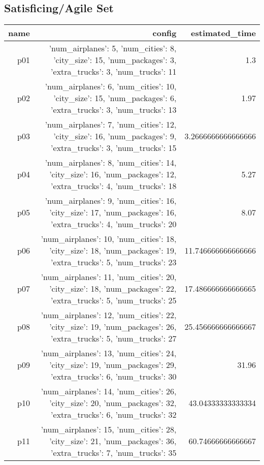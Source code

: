 \documentclass{article}
\begin{document}
                                \subsection*{Satisficing/Agile Set}
                                
                            \begin{center}
                            \scriptsize
                            \begin{tabular}{r|r|r}
                            name & config & estimated\_time\\\midrule
                              p01&{'num\_airplanes': 5, 'num\_cities': 8, 'city\_size': 15, 'num\_packages': 3, 'extra\_trucks': 3, 'num\_trucks': 11}&1.3\\
  p02&{'num\_airplanes': 6, 'num\_cities': 10, 'city\_size': 15, 'num\_packages': 6, 'extra\_trucks': 3, 'num\_trucks': 13}&1.97\\
  p03&{'num\_airplanes': 7, 'num\_cities': 12, 'city\_size': 16, 'num\_packages': 9, 'extra\_trucks': 3, 'num\_trucks': 15}&3.2666666666666666\\
  p04&{'num\_airplanes': 8, 'num\_cities': 14, 'city\_size': 16, 'num\_packages': 12, 'extra\_trucks': 4, 'num\_trucks': 18}&5.27\\
  p05&{'num\_airplanes': 9, 'num\_cities': 16, 'city\_size': 17, 'num\_packages': 16, 'extra\_trucks': 4, 'num\_trucks': 20}&8.07\\
  p06&{'num\_airplanes': 10, 'num\_cities': 18, 'city\_size': 18, 'num\_packages': 19, 'extra\_trucks': 5, 'num\_trucks': 23}&11.746666666666666\\
  p07&{'num\_airplanes': 11, 'num\_cities': 20, 'city\_size': 18, 'num\_packages': 22, 'extra\_trucks': 5, 'num\_trucks': 25}&17.486666666666665\\
  p08&{'num\_airplanes': 12, 'num\_cities': 22, 'city\_size': 19, 'num\_packages': 26, 'extra\_trucks': 5, 'num\_trucks': 27}&25.456666666666667\\
  p09&{'num\_airplanes': 13, 'num\_cities': 24, 'city\_size': 19, 'num\_packages': 29, 'extra\_trucks': 6, 'num\_trucks': 30}&31.96\\
  p10&{'num\_airplanes': 14, 'num\_cities': 26, 'city\_size': 20, 'num\_packages': 32, 'extra\_trucks': 6, 'num\_trucks': 32}&43.04333333333334\\
  p11&{'num\_airplanes': 15, 'num\_cities': 28, 'city\_size': 21, 'num\_packages': 36, 'extra\_trucks': 7, 'num\_trucks': 35}&60.74666666666667\\

\end{tabular}
\end{center}
\end{document}
